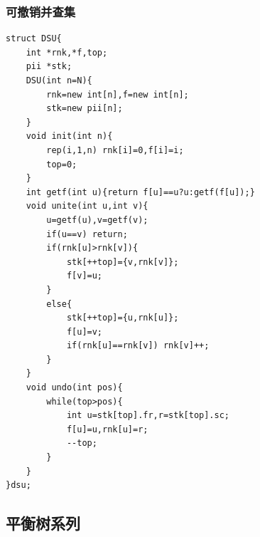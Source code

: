 \documentclass[a4]{ctexart}
\begin{document}
\subsubsection{可撤销并查集}
\begin{lstlisting}
struct DSU{
	int *rnk,*f,top;
	pii *stk;
	DSU(int n=N){
		rnk=new int[n],f=new int[n];
		stk=new pii[n];
	}
	void init(int n){
	    rep(i,1,n) rnk[i]=0,f[i]=i;
	    top=0;
	}
	int getf(int u){return f[u]==u?u:getf(f[u]);}
	void unite(int u,int v){
	    u=getf(u),v=getf(v);
	    if(u==v) return;
	    if(rnk[u]>rnk[v]){
	        stk[++top]={v,rnk[v]};
	        f[v]=u;
	    }
	    else{
	        stk[++top]={u,rnk[u]};
	        f[u]=v;
	        if(rnk[u]==rnk[v]) rnk[v]++;
	    }
	}
	void undo(int pos){
		while(top>pos){
		    int u=stk[top].fr,r=stk[top].sc;
		    f[u]=u,rnk[u]=r;
		    --top;
		}
	}
}dsu;
\end{lstlisting}
\subsection{平衡树系列}
\end{document}

